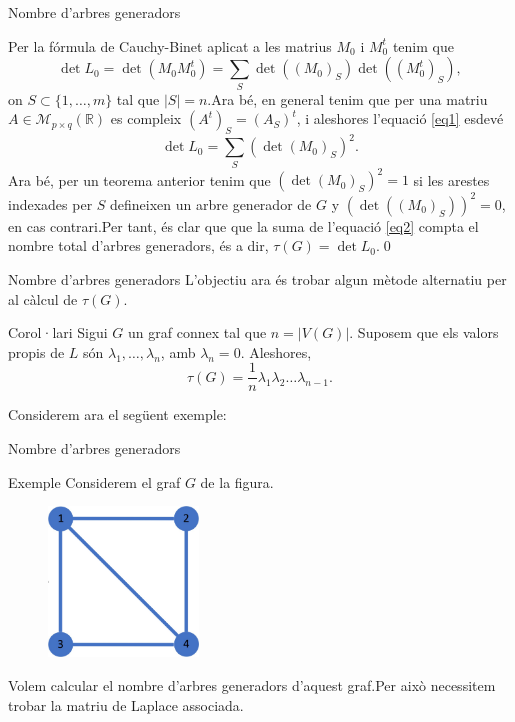 \documentclass{beamer}
\begin{document}
\begin{frame}{Nombre d'arbres generadors}
    \begin{block}{}
    Per la fórmula de Cauchy-Binet aplicat a les matrius $M_0$ i $M_0^t$ tenim que \begin{equation}
        \det L_0=\det(M_0M_0^t)=\sum_S\det((M_0)_S)\det((M_0^t)_S),
        \label{eq1}
    \end{equation} on $S\subset\{1,\ldots,m\}$ tal que $|S|=n$.\pause\space Ara bé, en general tenim que per una matriu $A\in\mathcal{M}_{p\times q}(\mathbb{R})$ es compleix $(A^t)_S=(A_S)^t$, i aleshores l'equació \ref{eq1} esdevé 
    \begin{equation}
        \det L_0=\sum_S(\det(M_0)_S)^2.
        \label{eq2}
    \end{equation}\pause
    Ara bé, per un teorema anterior tenim que $(\det(M_0)_S)^2=1$ si les arestes indexades per $S$ defineixen un arbre generador de $G$ y $(\det((M_0)_S))^2=0$, en cas contrari.\pause\space Per tant, és clar que que la suma de l'equació \ref{eq2} compta el nombre total d'arbres generadors, és a dir, $\tau(G)=\det L_0$.\qed
    \end{block}
\end{frame}
\begin{frame}{Nombre d'arbres generadors}
    L'objectiu ara és trobar algun mètode alternatiu per al càlcul de $\tau(G)$.\pause
    \begin{alertblock}{Corol·lari}
    Sigui $G$ un graf connex tal que $n=|V(G)|$. Suposem que els valors propis de $L$ són $\lambda_1,\ldots,\lambda_n$, amb $\lambda_n=0$. Aleshores, $$\tau(G)=\frac{1}{n}\lambda_1\lambda_2\ldots\lambda_{n-1}.$$ 
    \end{alertblock}\pause
Considerem ara el següent exemple:
\end{frame}
\begin{frame}{Nombre d'arbres generadors}
    \begin{exampleblock}{Exemple}
         Considerem el graf $G$ de la figura.
       \begin{figure}[ht]
           \centering
           \includegraphics[width=4cm]{imatges/graf1.jpg}
       \end{figure}
       Volem calcular el nombre d'arbres generadors d'aquest graf.\pause\space  Per això necessitem trobar la matriu de Laplace associada.
    \end{exampleblock}
\end{frame}
\end{document}
